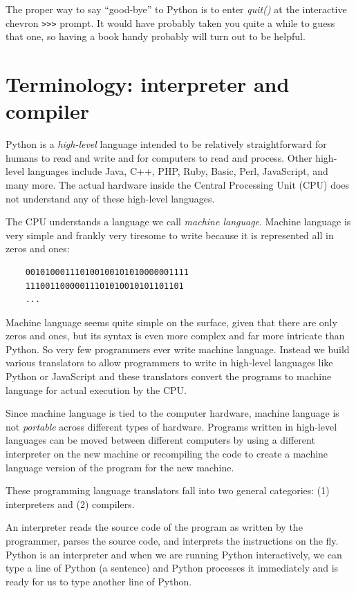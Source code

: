 The proper way to say ``good-bye'' to Python is to enter \emph{quit()} at the interactive chevron
\texttt{\textgreater{}\textgreater{}\textgreater{}} prompt. It would have probably taken you quite a while to guess that one, so having a book handy probably will turn out to be helpful.

\hypertarget{terminologuxeda-intuxe9rprete-y-compilador}{%
\section{Terminology: interpreter and
compiler}\label{terminologuxeda-intuxe9rprete-y-compilador}}

Python is a \emph{high-level} language intended to be relatively straightforward for humans to read and write and for computers to read and process. Other high-level languages include Java, C++, PHP, Ruby, Basic, Perl, JavaScript, and many more. The actual hardware inside the Central Processing Unit (CPU) does not understand any of these high-level languages.

The CPU understands a language we call \emph{machine language}. Machine language is very simple and frankly very tiresome to write because it is represented all in zeros and ones:

\begin{verbatim}
    001010001110100100101010000001111
    11100110000011101010010101101101
    ...
\end{verbatim}

Machine language seems quite simple on the surface, given that there are only zeros and ones, but its syntax is even more complex and far more intricate than Python. So very few programmers ever write machine language. Instead we build various translators to allow programmers to write in high-level languages like Python or JavaScript and these translators convert the programs to machine language for actual execution by the CPU.

Since machine language is tied to the computer hardware, machine language is not \emph{portable} across different types of hardware. Programs written in high-level languages can be moved between different computers by using a different interpreter on the new machine or recompiling the code to create a machine language version of the program for the new machine.

These programming language translators fall into two general categories: (1) interpreters and (2) compilers.

An interpreter reads the source code of the program as written by the programmer, parses the source code, and interprets the instructions on the fly. Python is an interpreter and when we are running Python interactively, we can type a line of Python (a sentence) and Python processes it immediately and is ready for us to type another line of Python.

